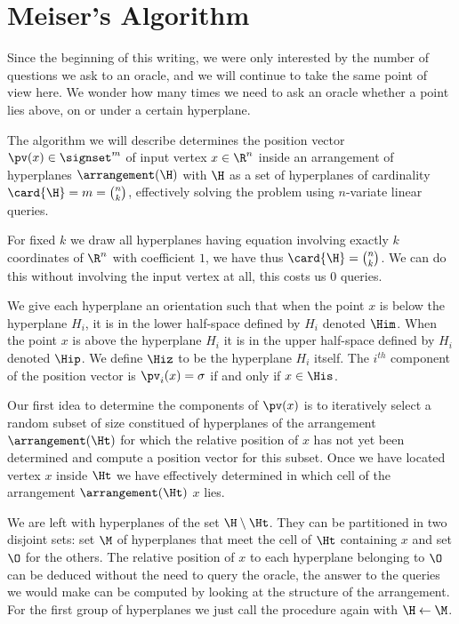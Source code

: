 \section{Meiser's Algorithm}


Since the beginning of this writing, we were only interested by the number of
questions we ask to an oracle, and we will continue to take the same point of
view here. We wonder how many times we need to ask an oracle whether a point
lies above, on or under a certain hyperplane.

The algorithm we will describe determines the position vector $\pv(x) \in
\signset^{m}$ of input vertex $x \in \R^n$ inside an
arrangement of hyperplanes $\arrangement(\H)$ with $\H$ as a set of hyperplanes
of cardinality $\card{\H} = m = \binom{n}{k}$,
effectively solving the \kSUM problem using  $n$-variate
linear queries.

For fixed $k$ we draw all hyperplanes having equation involving exactly $k$
coordinates of $\R^n$ with coefficient $1$, we have thus $\card{\H} =
\binom{n}{k}$. We can do this without involving the input vertex at all, this
costs us $0$ queries.

We give each hyperplane an orientation such that when the point $x$ is below
the
hyperplane $H_i$, it is in the lower half-space defined by $H_i$ denoted
$\Him$. When the point $x$ is above the hyperplane $H_i$ it is in the upper
half-space defined by $H_i$ denoted $\Hip$. We define $\Hiz$ to be the
hyperplane $H_i$ itself. The $i^{th}$ component of the position vector is
$\pv_i(x) = \sigma$ if and only if $x \in \His$.

Our first idea to determine the components of $\pv(x)$ is to iteratively
select a random subset of size  constitued of hyperplanes of the
arrangement $\arrangement(\Ht)$ for which the relative position of $x$ has not yet been
determined and compute a position vector for this subset. Once we have located
vertex $x$ inside $\Ht$ we have effectively determined in
which cell of the arrangement $\arrangement(\Ht)$ $x$ lies.

We are left with hyperplanes of the set $\H \setminus \Ht$. They can be
partitioned in two disjoint sets: set $\M$ of hyperplanes that meet the cell of
$\Ht$ containing $x$ and set $\O$ for the others. The relative position of $x$
to each hyperplane belonging to $\O$ can be deduced without the need to query
the oracle, the answer to the queries we would make can be computed by looking
at the structure of the arrangement. For the first group of hyperplanes
we just call the procedure again with $\H \gets \M$.

